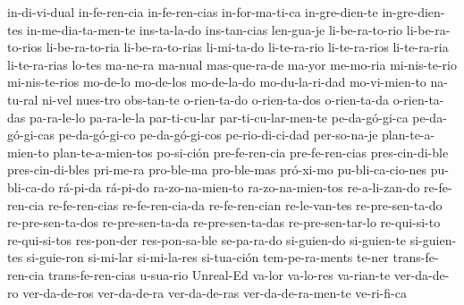 {  in-di-vi-dual
  in-fe-ren-cia
  in-fe-ren-cias
  in-for-ma-ti-ca
  in-gre-dien-te
  in-gre-dien-tes
  in-me-dia-ta-men-te
  ins-ta-la-do
  ins-tan-cias
  len-gua-je
  li-be-ra-to-rio
  li-be-ra-to-rios
  li-be-ra-to-ria
  li-be-ra-to-rias
  li-mi-ta-do
  li-te-ra-rio
  li-te-ra-rios
  li-te-ra-ria
  li-te-ra-rias
  lo-tes
  ma-ne-ra
  ma-nual
  mas-que-ra-de
  ma-yor
  me-mo-ria
  mi-nis-te-rio
  mi-nis-te-rios
  mo-de-lo
  mo-de-los
  mo-de-la-do
  mo-du-la-ri-dad
  mo-vi-mien-to
  na-tu-ral
  ni-vel
  nues-tro
  obs-tan-te
  o-rien-ta-do
  o-rien-ta-dos
  o-rien-ta-da
  o-rien-ta-das
  pa-ra-le-lo
  pa-ra-le-la
  par-ti-cu-lar
  par-ti-cu-lar-men-te
  pe-da-gó-gi-ca
  pe-da-gó-gi-cas
  pe-da-gó-gi-co
  pe-da-gó-gi-cos
  pe-rio-di-ci-dad
  per-so-na-je
  plan-te-a-mien-to
  plan-te-a-mien-tos
  po-si-ción
  pre-fe-ren-cia
  pre-fe-ren-cias
  pres-cin-di-ble
  pres-cin-di-bles
  pri-me-ra
  pro-ble-ma
  pro-ble-mas
  pró-xi-mo
  pu-bli-ca-cio-nes
  pu-bli-ca-do
  rá-pi-da
  rá-pi-do
  ra-zo-na-mien-to
  ra-zo-na-mien-tos
  re-a-li-zan-do
  re-fe-ren-cia
  re-fe-ren-cias
  re-fe-ren-cia-da
  re-fe-ren-cian
  re-le-van-tes
  re-pre-sen-ta-do
  re-pre-sen-ta-dos
  re-pre-sen-ta-da
  re-pre-sen-ta-das
  re-pre-sen-tar-lo
  re-qui-si-to
  re-qui-si-tos
  res-pon-der
  res-pon-sa-ble
  se-pa-ra-do
  si-guien-do
  si-guien-te
  si-guien-tes
  si-guie-ron
  si-mi-lar
  si-mi-la-res
  si-tua-ción
  tem-pe-ra-ments
  te-ner
  trans-fe-ren-cia
  trans-fe-ren-cias
  u-sua-rio
  Unreal-Ed
  va-lor
  va-lo-res
  va-rian-te
  ver-da-de-ro
  ver-da-de-ros
  ver-da-de-ra
  ver-da-de-ras
  ver-da-de-ra-men-te
  ve-ri-fi-ca
}
